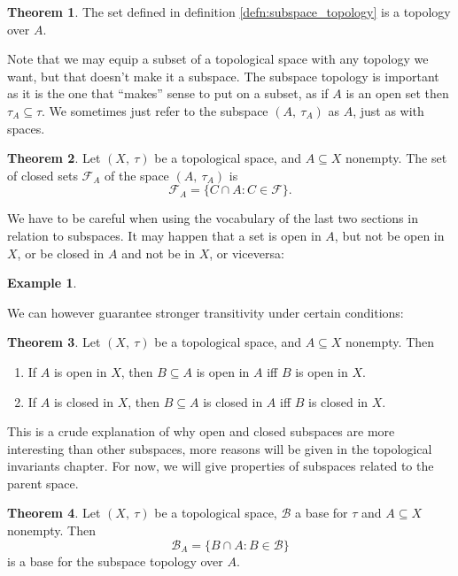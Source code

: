 \documentclass[a4paper]{book}
\theoremstyle{definition}
\newtheorem{theorem}{Theorem}[section]
\theoremstyle{ejemplo}
\newtheorem{example}{Example}[section]
\theoremstyle{demostracion}
\begin{document}
\begin{theorem}
	The set defined in definition \ref{defn:subspace_topology} is a topology over $A$.
\end{theorem}

Note that we may equip a subset of a topological space with any topology we want, but that doesn't make it a subspace. The subspace topology is important as it is the one that ``makes'' sense to put on a subset, as if $A$ is an open set then $\tau_A \subseteq \tau$. We sometimes just refer to the subspace $(A,\ \tau_A)$ as $A$, just as with spaces.

\begin{theorem}
	Let $(X,\ \tau)$ be a topological space, and $A \subseteq X$ nonempty. The set of closed sets $\mathcal{F}_A$ of the space $(A,\ \tau_A)$ is
	\begin{equation*}
		\mathcal{F}_A = \{C \cap A : C \in \mathcal{F} \}.
	\end{equation*}
\end{theorem}

We have to be careful when using the vocabulary of the last two sections in relation to subspaces. It may happen that a set is open in $A$, but not be open in $X$, or be closed in $A$ and not be in $X$, or viceversa:
\begin{example}

\end{example}

We can however guarantee stronger transitivity under certain conditions:
\begin{theorem}
	Let $(X,\ \tau)$ be a topological space, and $A \subseteq X$ nonempty. Then
	\begin{enumerate}
		\item
		If $A$ is open in $X$, then $B \subseteq A$ is open in $A$ iff $B$ is open in $X$.
		
		\item
		If $A$ is closed in $X$, then $B \subseteq A$ is closed in $A$ iff $B$ is closed in $X$.
	\end{enumerate}
\end{theorem}
This is a crude explanation of why open and closed subspaces are more interesting than other subspaces, more reasons will be given in the topological invariants chapter. For now, we will give properties of subspaces related to the parent space.

\begin{theorem}\label{thm:subspace_inherits_base}
	Let $(X,\ \tau)$ be a topological space, $\mathcal{B}$ a base for $\tau$ and $A \subseteq X$ nonempty. Then
	\begin{equation*}
		\mathcal{B}_A = \{ B \cap A : B \in \mathcal{B}\}
	\end{equation*}
	is a base for the subspace topology over $A$.
\end{theorem}
\end{document}
